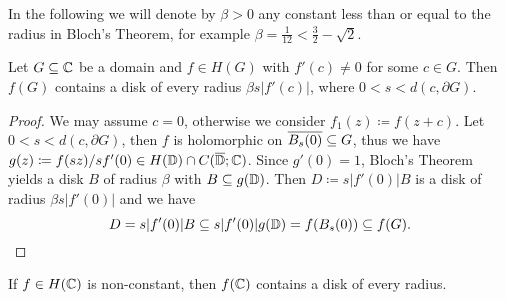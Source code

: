 In the following we will denote by $\beta > 0$ any constant less than or equal to the radius in Bloch's Theorem, for example $\beta = \frac{1}{12} < \frac{3}{2} - \sqrt{2}$.

\begin{corollary} \label{cor:bloch-domain}
    Let $G \subseteq \mathbb{C}$ be a domain and $f \in H(G)$ with $f'(c) \neq 0$ for some $c \in G$. Then $f(G)$ contains a disk of every radius $\beta s \vert f'(c) \vert$, where $0 < s < d(c, \partial G)$.
\end{corollary}

\begin{proof}
    We may assume $c = 0$, otherwise we consider $f_1(z) \coloneqq f(z+c)$. Let $0 < s < d(c, \partial G)$, then $f$ is holomorphic on $\overline{B_s(0)} \subseteq G$, thus we have $g(z) \coloneqq f(sz) / sf'(0) \in H(\mathbb{D}) \cap C(\overline{\mathbb{D}}; \mathbb{C})$. Since $g'(0) = 1$, Bloch's Theorem yields a disk $B$ of radius $\beta$ with $B \subseteq g(\mathbb{D})$. Then $D \coloneqq s \vert f'(0) \vert B$ is a disk of radius $\beta s \vert f'(0) \vert$ and we have
    \begin{equation*}
        D = s \vert f'(0) \vert B \subseteq s \vert f'(0) \vert g(\mathbb{D}) = f(B_s(0)) \subseteq f(G).
    \end{equation*}
\end{proof}

\begin{corollary} \label{cor:bloch-entire}
    If $f \in H(\mathbb{C})$ is non-constant, then $f(\mathbb{C})$ contains a disk of every radius.
\end{corollary}